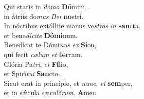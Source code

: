 \evenverse Qui statis in \textit{do}\textit{mo} \textbf{Dó}mini,~\*\\
\evenverse in átriis do\textit{mus} \textit{De}\textit{i} \textbf{no}stri.\\
\oddverse In nóctibus extóllite manus ve\textit{stras} \textit{in} \textbf{san}cta,~\*\\
\oddverse et bene\textit{dí}\textit{ci}\textit{te} \textbf{Dó}\textbf{mi}num.\\
\evenverse Benedícat te Dómi\textit{nus} \textit{ex} \textbf{Si}on,~\*\\
\evenverse qui fecit \textit{cæ}\textit{lum} \textit{et} \textbf{ter}ram.\\
\oddverse Glória Pa\textit{tri}, \textit{et} \textbf{Fí}lio,~\*\\
\oddverse et Spi\textit{rí}\textit{tu}\textit{i} \textbf{San}cto.\\
\evenverse Sicut erat in princípio, et \textit{nunc}, \textit{et} \textbf{sem}per,~\*\\
\evenverse et in sǽcula sæ\textit{cu}\textit{ló}\textit{rum}. \textbf{A}men.\\
